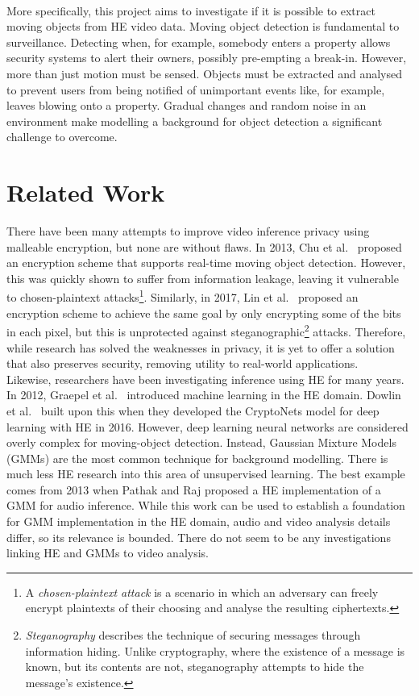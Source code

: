 \smallskip \\ \indent
More specifically, this project aims to investigate if it is possible to extract moving objects from HE video data. Moving object detection is fundamental to surveillance. Detecting when, for example, somebody enters a property allows security systems to alert their owners, possibly pre-empting a break-in. However, more than just motion must be sensed. Objects must be extracted and analysed to prevent users from being notified of unimportant events like, for example, leaves blowing onto a property. Gradual changes and random noise in an environment make modelling a background for object detection a significant challenge to overcome.






\section{Related Work}
\label{sec:relatedWork}
\indent \indent
There have been many attempts to improve video inference privacy using malleable encryption, but none are without flaws. In 2013, Chu et al.\ \cite{Chu} proposed an encryption scheme that supports real-time moving object detection. However, this was quickly shown to suffer from information leakage, leaving it vulnerable to chosen-plaintext attacks\footnote{A \textit{chosen-plaintext attack} is a scenario in which an adversary can freely encrypt plaintexts of their choosing and analyse the resulting ciphertexts.}. Similarly, in 2017, Lin et al.\ \cite{Lin} proposed an encryption scheme to achieve the same goal by only encrypting some of the bits in each pixel, but this is unprotected against steganographic\footnote{\textit{Steganography} describes the technique of securing messages through information hiding. Unlike cryptography, where the existence of a message is known, but its contents are not, steganography attempts to hide the message's existence.} attacks. Therefore, while research has solved the weaknesses in privacy, it is yet to offer a solution that also preserves security, removing utility to real-world applications.
\smallskip \\ \indent
Likewise, researchers have been investigating inference using HE for many years. In 2012, Graepel et al.\ \cite{Graepel} introduced machine learning in the HE domain. Dowlin et al.\ \cite{Dowlin} built upon this when they developed the CryptoNets model for deep learning with HE in 2016. However, deep learning neural networks are considered overly complex for moving-object detection. Instead, Gaussian Mixture Models (GMMs) are the most common technique for background modelling. There is much less HE research into this area of unsupervised learning. The best example comes from 2013 when Pathak and Raj \cite{Pathak} proposed a HE implementation of a GMM for audio inference. While this work can be used to establish a foundation for GMM implementation in the HE domain, audio and video analysis details differ, so its relevance is bounded. There do not seem to be any investigations linking HE and GMMs to video analysis.
